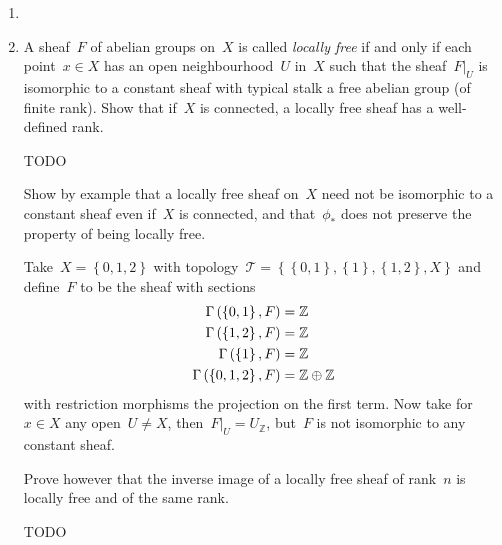 \documentclass[a4paper,11pt,oneside,openany,article]{memoir}
\begin{document}
\begin{enumerate}
  \item 

  \item A sheaf~$F$ of abelian groups on~$X$ is called \emph{locally free} if and only if each point~$x\in X$ has an open neighbourhood~$U$ in~$X$ such that the sheaf~$F|_U$ is isomorphic to a constant sheaf with typical stalk a free abelian group (of finite rank). Show that if~$X$ is connected, a locally free sheaf has a well-defined rank.

    \begin{solution}
      TODO
    \end{solution}

    Show by example that a locally free sheaf on~$X$ need not be isomorphic to a constant sheaf even if~$X$ is connected, and that~$\phi_*$ does not preserve the property of being locally free.

    \begin{solution}
      Take~$X=\left\{ 0,1,2 \right\}$ with topology~$\mathcal{T}=\left\{ \left\{ 0,1 \right\},\left\{ 1 \right\},\left\{ 1,2 \right\},X \right\}$ and define~$F$ to be the sheaf with sections
      \begin{align}
        \mathrm{\Gamma}\left( \left\{ 0,1 \right\},F \right)&=\mathbb{Z} \\
        \mathrm{\Gamma}\left( \left\{ 1,2 \right\},F \right)&=\mathbb{Z} \\
        \mathrm{\Gamma}\left( \left\{ 1 \right\},F \right)&=\mathbb{Z} \\
        \mathrm{\Gamma}\left( \left\{ 0,1,2 \right\},F \right)&=\mathbb{Z}\oplus\mathbb{Z}
      \end{align}
      with restriction morphisms the projection on the first term. Now take for~$x\in X$ any open~$U\neq X$, then~$F|_U=U_\mathbb{Z}$, but~$F$ is not isomorphic to any constant sheaf.
      

    \end{solution}

    Prove however that the inverse image of a locally free sheaf of rank~$n$ is locally free and of the same rank.

    \begin{solution}
      TODO
    \end{solution}
\end{enumerate}



\end{document}

